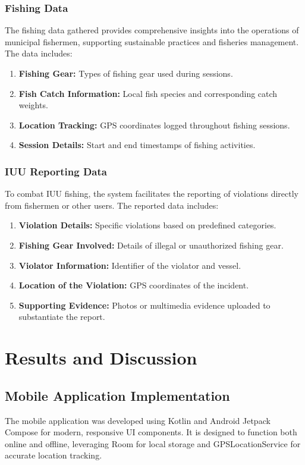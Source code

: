 \documentclass[journal]{IEEEtran}
\begin{document}
\subsubsection{Fishing Data}
The fishing data gathered provides comprehensive insights into the operations of municipal fishermen, supporting sustainable practices and fisheries management. The data includes:
\begin{enumerate}
    \item \textbf{Fishing Gear:} Types of fishing gear used during sessions.
    \item \textbf{Fish Catch Information:} Local fish species and corresponding catch weights.
    \item \textbf{Location Tracking:} GPS coordinates logged throughout fishing sessions.
    \item \textbf{Session Details:} Start and end timestamps of fishing activities.
\end{enumerate}

\subsubsection{IUU Reporting Data}
To combat IUU fishing, the system facilitates the reporting of violations directly from fishermen or other users. The reported data includes:
\begin{enumerate}
    \item \textbf{Violation Details:} Specific violations based on predefined categories.
    \item \textbf{Fishing Gear Involved:} Details of illegal or unauthorized fishing gear.
    \item \textbf{Violator Information:} Identifier of the violator and vessel.
    \item \textbf{Location of the Violation:} GPS coordinates of the incident.
    \item \textbf{Supporting Evidence:} Photos or multimedia evidence uploaded to substantiate the report.
\end{enumerate}

\section{Results and Discussion}
\label{sec:results}

\subsection{Mobile Application Implementation}
The mobile application was developed using Kotlin and Android Jetpack Compose for modern, responsive UI components. It is designed to function both online and offline, leveraging Room for local storage and GPSLocationService for accurate location tracking.
\end{document}
